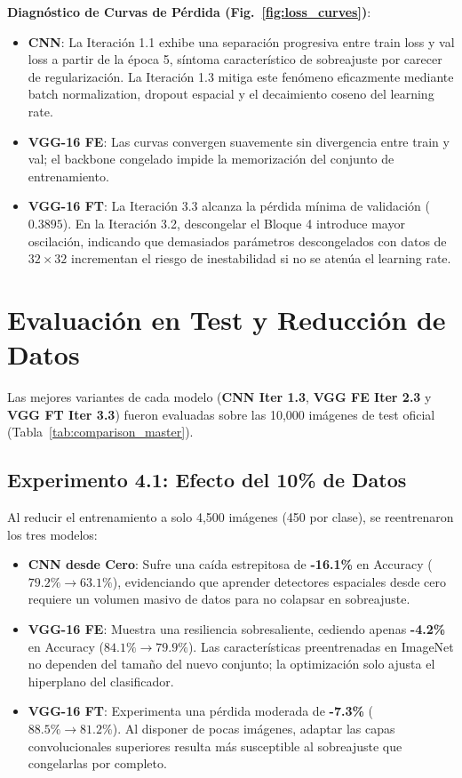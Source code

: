 \documentclass[10pt,twocolumn,a4paper]{article}
\begin{document}
\textbf{Diagnóstico de Curvas de Pérdida (Fig.~\ref{fig:loss_curves})}:
\begin{itemize}\setlength\itemsep{0em}
    \item \textbf{CNN}: La Iteración 1.1 exhibe una separación progresiva entre train loss y val loss a partir de la época 5, síntoma característico de sobreajuste por carecer de regularización. La Iteración 1.3 mitiga este fenómeno eficazmente mediante batch normalization, dropout espacial y el decaimiento coseno del learning rate.
    \item \textbf{VGG-16 FE}: Las curvas convergen suavemente sin divergencia entre train y val; el backbone congelado impide la memorización del conjunto de entrenamiento.
    \item \textbf{VGG-16 FT}: La Iteración 3.3 alcanza la pérdida mínima de validación ($0.3895$). En la Iteración 3.2, descongelar el Bloque 4 introduce mayor oscilación, indicando que demasiados parámetros descongelados con datos de $32\times 32$ incrementan el riesgo de inestabilidad si no se atenúa el learning rate.
\end{itemize}

\section{Evaluación en Test y Reducción de Datos}
Las mejores variantes de cada modelo (\textbf{CNN Iter 1.3}, \textbf{VGG FE Iter 2.3} y \textbf{VGG FT Iter 3.3}) fueron evaluadas sobre las 10,000 imágenes de test oficial (Tabla~\ref{tab:comparison_master}).

\subsection{Experimento 4.1: Efecto del 10\% de Datos}
Al reducir el entrenamiento a solo 4,500 imágenes (450 por clase), se reentrenaron los tres modelos:
\begin{itemize}\setlength\itemsep{0em}
    \item \textbf{CNN desde Cero}: Sufre una caída estrepitosa de \textbf{-16.1\%} en Accuracy ($79.2\% \to 63.1\%$), evidenciando que aprender detectores espaciales desde cero requiere un volumen masivo de datos para no colapsar en sobreajuste.
    \item \textbf{VGG-16 FE}: Muestra una resiliencia sobresaliente, cediendo apenas \textbf{-4.2\%} en Accuracy ($84.1\% \to 79.9\%$). Las características preentrenadas en ImageNet no dependen del tamaño del nuevo conjunto; la optimización solo ajusta el hiperplano del clasificador.
    \item \textbf{VGG-16 FT}: Experimenta una pérdida moderada de \textbf{-7.3\%} ($88.5\% \to 81.2\%$). Al disponer de pocas imágenes, adaptar las capas convolucionales superiores resulta más susceptible al sobreajuste que congelarlas por completo.
\end{itemize}
\end{document}
